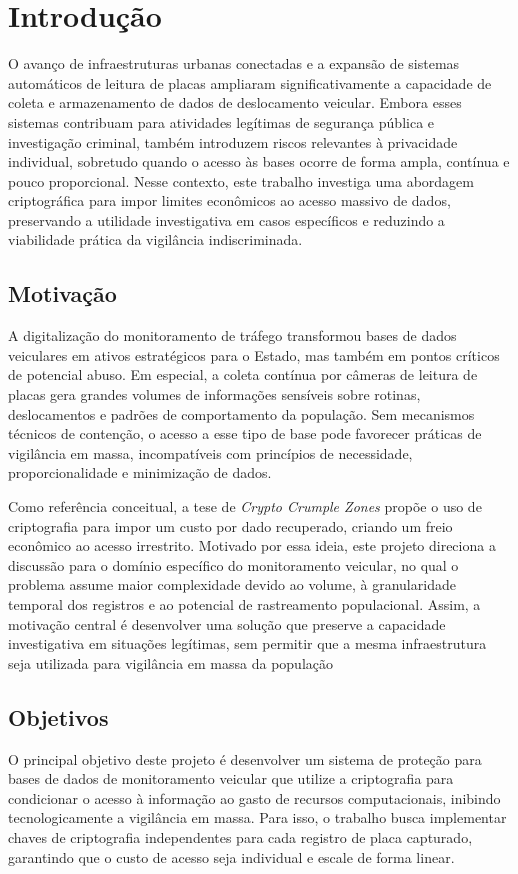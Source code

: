 \chapter{Introdução} \label{cap:introducao}

O avanço de infraestruturas urbanas conectadas e a expansão de sistemas automáticos de leitura de placas ampliaram significativamente a capacidade de coleta e armazenamento de dados de deslocamento veicular. Embora esses sistemas contribuam para atividades legítimas de segurança pública e investigação criminal, também introduzem riscos relevantes à privacidade individual, sobretudo quando o acesso às bases ocorre de forma ampla, contínua e pouco proporcional. Nesse contexto, este trabalho investiga uma abordagem criptográfica para impor limites econômicos ao acesso massivo de dados, preservando a utilidade investigativa em casos específicos e reduzindo a viabilidade prática da vigilância indiscriminada.

\section{Motivação}
A digitalização do monitoramento de tráfego transformou bases de dados veiculares em ativos estratégicos para o Estado, mas também em pontos críticos de potencial abuso. Em especial, a coleta contínua por câmeras de leitura de placas gera grandes volumes de informações sensíveis sobre rotinas, deslocamentos e padrões de comportamento da população. Sem mecanismos técnicos de contenção, o acesso a esse tipo de base pode favorecer práticas de vigilância em massa, incompatíveis com princípios de necessidade, proporcionalidade e minimização de dados.

Como referência conceitual, a tese de \textit{Crypto Crumple Zones} \cite{wright2018} propõe o uso de criptografia para impor um custo por dado recuperado, criando um freio econômico ao acesso irrestrito. Motivado por essa ideia, este projeto direciona a discussão para o domínio específico do monitoramento veicular, no qual o problema assume maior complexidade devido ao volume, à granularidade temporal dos registros e ao potencial de rastreamento populacional. Assim, a motivação central é desenvolver uma solução que preserve a capacidade investigativa em situações legítimas, sem permitir que a mesma infraestrutura seja utilizada para vigilância em massa da população

\section{Objetivos}
O principal objetivo deste projeto é desenvolver um sistema de proteção para bases de dados de monitoramento veicular que utilize a criptografia para condicionar o acesso à informação ao gasto de recursos computacionais, inibindo tecnologicamente a vigilância em massa. Para isso, o trabalho busca implementar chaves de criptografia independentes para cada registro de placa capturado, garantindo que o custo de acesso seja individual e escale de forma linear.

